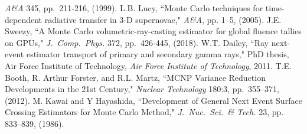 \documentclass[]{article}
\begin{document}
\begin{thebibliography}{99}
	{\em A\&A} 345, pp.\ 211-216, (1999).
 L.B. Lucy, ``Monte Carlo techniques for time-dependent radiative transfer in 3-D supernovae,"
	{\em A\&A}, pp. 1--5, (2005).
 J.E. Sweezy, ``A Monte Carlo volumetric-ray-casting estimator for global fluence tallies on GPUs,"
	{\em J.\ Comp.\ Phys.} 372, pp.\ 426-445, (2018).
 W.T. Dailey, ``Ray next-event estimator transport of primary and secondary gamma rays," PhD thesis, Air Force Institute of Technology, 
	{\em Air Force Institute of Technology}, 2011.
 T.E. Booth, R. Arthur Forster, and R.L. Martz, ``MCNP Variance Reduction Developments in the 21st Century,"
	{\em  Nuclear Technology} 180:3, pp.\ 355--371, (2012).	
 M. Kawai and Y Hayashida, ``Development of General Next Event Surface Crossing Estimators for Monte Carlo Method,"
	{\em J.\ Nuc.\ Sci.\ \& Tech.} 23, pp. 833--839, (1986). 
	
\end{thebibliography}
\end{document}

